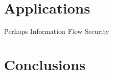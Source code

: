 \documentclass{article}
\newcommand{\jc}[1]{\fbox{Jacques says:} \textbf{#1}}
\begin{document}
\section{Applications}

Perhaps Information Flow Security


\section{Conclusions}

\end{document}
